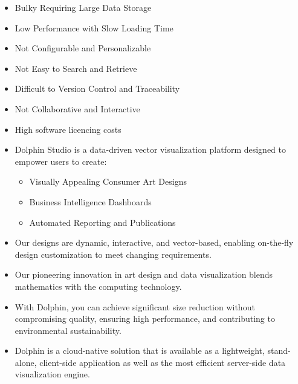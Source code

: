 \documentclass{ammTalk}
\begin{document}
\begin{itemize}[itemsep=6mm]\LARGE
\item Bulky Requiring Large Data Storage
\item Low Performance with Slow Loading Time
\item Not Configurable and Personalizable
\item Not Easy to Search and Retrieve
\item Difficult to Version Control and Traceability
\item Not Collaborative and Interactive
\item High software licencing costs
\end{itemize}


\begin{itemize}[itemsep=6mm]\LARGE
\item Dolphin Studio is a data-driven vector visualization platform designed to empower users to create:
\begin{itemize}\Large
\item Visually Appealing Consumer Art Designs
\item Business Intelligence Dashboards
\item Automated Reporting and Publications
\end{itemize}
\item Our designs are dynamic, interactive, and vector-based, enabling on-the-fly design customization to meet changing requirements.
\item Our pioneering innovation in art design and data visualization blends mathematics with the computing technology.
\item With Dolphin, you can achieve significant size reduction without compromising quality, ensuring high performance, and contributing to environmental sustainability.
\item Dolphin is a cloud-native solution that is available as a lightweight, stand-alone, client-side application as well as the most efficient server-side data visualization engine.
\end{itemize}
\end{document}
